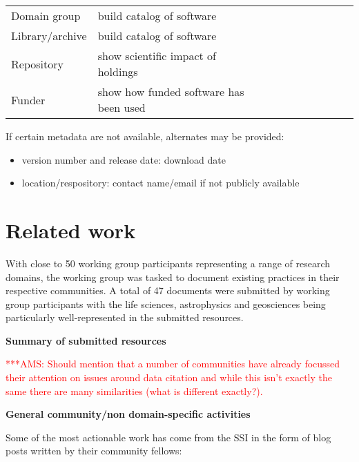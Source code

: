 \documentclass[11pt, oneside]{amsart}
\newcommand{\asnote}[1]{ {\textcolor{red} { ***AMS: #1 }}}
\begin{document}
\begin{table}[htbp]
\begin{tabular}{@{}l l c c c c c c c c@{}}
Domain group & build catalog of software 			& \textbullet & \textbullet & \textbullet & \textbullet & \textbullet & \textbullet &  & \\
Library\slash archive & build catalog of software 	& \textbullet & \textbullet & \textbullet & \textbullet & \textbullet & \textbullet &  & \\
Repository & show scientific impact of holdings 	& \textbullet &   &   &   &   & \textbullet & \textbullet & \\
Funder & show how funded software has been used		& \textbullet &   &   &   &   & \textbullet & \textbullet & \\
\bottomrule
\end{tabular}
\label{tab:use_cases}
\end{table}%

If certain metadata are not available, alternates may be provided:
\begin{itemize}
\item version number and release date: download date
\item location\slash respository: contact name\slash email if not publicly available
\end{itemize}




\section{Related work}
\label{sec:related_work}

With close to 50 working group participants representing a range of research domains, the working group was tasked to
document existing practices in their respective communities. A total of 47 documents were submitted by working group
participants with the life sciences, astrophysics and geosciences being particularly well-represented in the submitted
resources.

\textbf{Summary of submitted resources}

\asnote{Should mention that a number of communities have already focussed their attention on issues around data citation and while
this isn't exactly the same there are many similarities (what is different exactly?).}

\textbf{General community/non domain-specific activities}

Some of the most actionable work has come from the SSI in the form of blog posts written by their community fellows:
\end{document}
